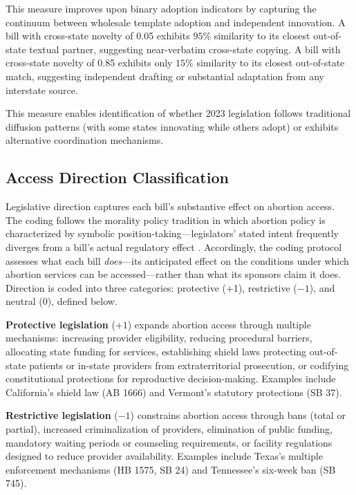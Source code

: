 This measure improves upon binary adoption indicators by capturing the continuum between wholesale template adoption and independent innovation. A bill with cross-state novelty of 0.05 exhibits $95\%$ similarity to its closest out-of-state textual partner, suggesting near-verbatim cross-state copying. A bill with cross-state novelty of 0.85 exhibits only $15\%$ similarity to its closest out-of-state match, suggesting independent drafting or substantial adaptation from any interstate source.

This measure enables identification of whether 2023 legislation follows traditional diffusion patterns (with some states innovating while others adopt) or exhibits alternative coordination mechanisms.

\subsection{Access Direction Classification}
Legislative direction captures each bill's substantive effect on abortion access. The coding follows the morality policy tradition in which abortion policy is characterized by symbolic position-taking---legislators' stated intent frequently diverges from a bill's actual regulatory effect \parencite{mooneyInfluenceValuesConsensus2000, mooneyDoesMoralityPolicy2008a}.
Accordingly, the coding protocol assesses what each bill \textit{does}---its anticipated effect on the conditions under which abortion services can be accessed---rather than what its sponsors claim it does. Direction is coded into three categories: protective (+1), restrictive ($-1$), and neutral (0), defined below.

\textbf{Protective legislation} ($+1$) expands abortion access through multiple mechanisms: increasing provider eligibility, reducing procedural barriers, allocating state funding for services, establishing shield laws protecting out-of-state patients or in-state providers from extraterritorial prosecution, or codifying constitutional protections for reproductive decision-making. Examples include California's shield law (AB 1666) and Vermont's statutory protections (SB 37).

\textbf{Restrictive legislation} ($-1$) constrains abortion access through bans (total or partial), increased criminalization of providers, elimination of public funding, mandatory waiting periods or counseling requirements, or facility regulations designed to reduce provider availability. Examples include Texas's multiple enforcement mechanisms (HB 1575, SB 24) and Tennessee's six-week ban (SB 745).

